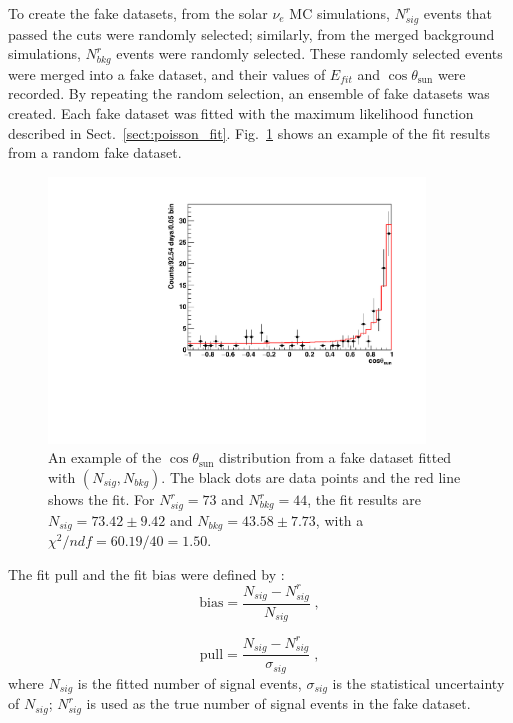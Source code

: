 To create the fake datasets, from the solar $\nu_e$ MC simulations, $N^r_{sig}$ events that passed the cuts were randomly selected; similarly, from the merged background simulations, $N^r_{bkg}$ events were randomly selected. These randomly selected events were merged into a fake dataset, and their values of $E_{fit}$ and $\cos\theta_\mathrm{sun}$ were recorded.
By repeating the random selection, an ensemble of fake datasets was created. Each fake dataset was fitted with the maximum likelihood function described in Sect.~\ref{sect:poisson_fit}. Fig.~\ref{ensemble_test} shows an example of the fit results from a random fake dataset.

\begin{figure}[!htb]
	\centering
	\includegraphics[width=10cm]{ensemble_fitExample.pdf}
	\caption[An example of the $\cos\theta_\mathrm{sun}$ distribution fitted with $(N_{sig},N_{bkg})$.]{An example of the $\cos\theta_\mathrm{sun}$ distribution from a fake dataset fitted with $(N_{sig},N_{bkg})$. The black dots are data points and the red line shows the fit. For $N^r_{sig} = 73$ and $N^r_{bkg}=44$, the fit results are $N_{sig} = 73.42\pm9.42$ and $N_{bkg} = 43.58 \pm 7.73$, with a $\chi^2/ndf = 60.19/40 = 1.50$.	\label{ensemble_test}}
\end{figure} 

The fit pull and the fit bias were defined by \cite{leta}:
\begin{equation}
\mathrm{bias}=\frac{N_{sig}-N^r_{sig}}{N_{sig}}\; ,
\end{equation}

\begin{equation}
\mathrm{pull}=\frac{N_{sig}-N^r_{sig}}{\sigma_{sig}}\; ,
\end{equation}
where $N_{sig}$ is the fitted number of signal events, $\sigma_{sig}$ is the statistical uncertainty of $N_{sig}$; $N^{r}_{sig}$ is used as the true number of signal events in the fake dataset.

